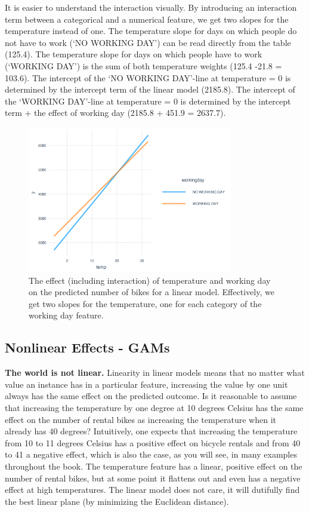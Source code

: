 \documentclass[
  10pt,
]{scrbook}
\begin{document}
It is easier to understand the interaction visually.
By introducing an interaction term between a categorical and a numerical feature, we get two slopes for the temperature instead of one.
The temperature slope for days on which people do not have to work (`NO WORKING DAY') can be read directly from the table (125.4).
The temperature slope for days on which people have to work (`WORKING DAY') is the sum of both temperature weights (125.4 -21.8 = 103.6).
The intercept of the `NO WORKING DAY'-line at temperature = 0 is determined by the intercept term of the linear model (2185.8).
The intercept of the `WORKING DAY'-line at temperature = 0 is determined by the intercept term + the effect of working day (2185.8 + 451.9 = 2637.7).

\begin{figure}

{\centering \includegraphics[width=0.8\textwidth]{images/interaction-plot-1} 

}

\caption{The effect (including interaction) of temperature and working day on the predicted number of bikes for a linear model. Effectively, we get two slopes for the temperature, one for each category of the working day feature.}\label{fig:interaction-plot}
\end{figure}

\hypertarget{gam}{%
\subsection{Nonlinear Effects - GAMs}\label{gam}}

\textbf{The world is not linear.}
Linearity in linear models means that no matter what value an instance has in a particular feature, increasing the value by one unit always has the same effect on the predicted outcome.
Is it reasonable to assume that increasing the temperature by one degree at 10 degrees Celsius has the same effect on the number of rental bikes as increasing the temperature when it already has 40 degrees?
Intuitively, one expects that increasing the temperature from 10 to 11 degrees Celsius has a positive effect on bicycle rentals and from 40 to 41 a negative effect, which is also the case, as you will see, in many examples throughout the book.
The temperature feature has a linear, positive effect on the number of rental bikes, but at some point it flattens out and even has a negative effect at high temperatures.
The linear model does not care, it will dutifully find the best linear plane (by minimizing the Euclidean distance).
\end{document}
